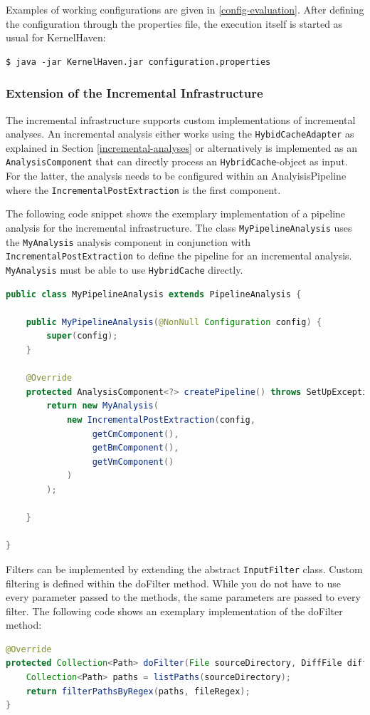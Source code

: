 \documentclass[a4paper]{article}
\begin{document}
Examples of working configurations are given in \autoref{config-evaluation}. After defining the configuration through the properties file, the execution itself is started as usual for KernelHaven:

\begin{lstlisting}
$ java -jar KernelHaven.jar configuration.properties
\end{lstlisting}



\subsubsection{Extension of the Incremental Infrastructure}

The incremental infrastructure supports custom implementations of incremental analyses. An incremental analysis either works using the \texttt{Hybid\-Cache\-Adapter} as explained in Section \ref{incremental-analyses} or alternatively is implemented as an \texttt{Analysis\-Component} that can directly process an \texttt{Hybrid\-Cache}-object as input. For the latter, the analysis needs to be configured within an AnalyisisPipeline where the \texttt{Incremental\-Post\-Extraction} is the first component.

The following code snippet shows the exemplary implementation of a pipeline analysis for the incremental infrastructure. The class \texttt{MyPipelineAnalysis} uses the \texttt{MyAnalysis} analysis component in conjunction with \texttt{Incremental\-Post\-Extraction} to define the pipeline for an incremental analysis. \texttt{MyAnalysis} must be able to use \texttt{HybridCache} directly.

\begin{lstlisting}[language=java]
public class MyPipelineAnalysis extends PipelineAnalysis {

	public MyPipelineAnalysis(@NonNull Configuration config) {
		super(config);
	}
	
	@Override
	protected AnalysisComponent<?> createPipeline() throws SetUpException {
		return new MyAnalysis(
		    new IncrementalPostExtraction(config, 
		         getCmComponent(), 
		         getBmComponent(), 
		         getVmComponent()
		    )
		);

	}

}
\end{lstlisting}

Filters can be implemented by extending the abstract \texttt{InputFilter} class. Custom filtering is defined within the doFilter method. While you do not have to use every parameter passed to the methods, the same parameters are passed to every filter. The following code shows an exemplary implementation of the doFilter method:
\begin{lstlisting}[language=java]
@Override
protected Collection<Path> doFilter(File sourceDirectory, DiffFile diffFile, Pattern fileRegex, boolean includeDeletions) throws IOException {
	Collection<Path> paths = listPaths(sourceDirectory);	
	return filterPathsByRegex(paths, fileRegex);
}
\end{lstlisting}
\end{document}
